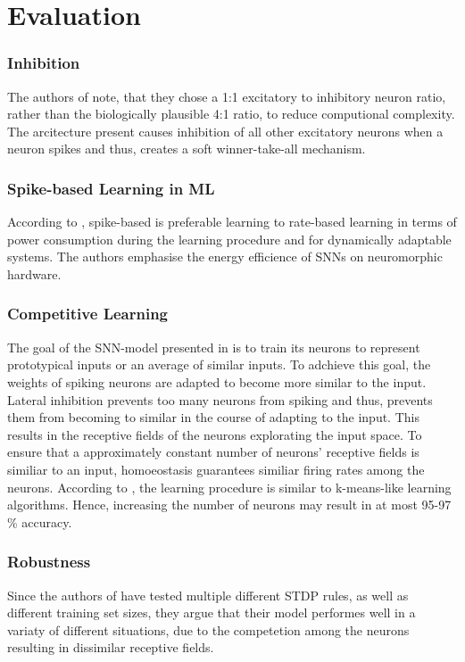\section{Evaluation}
\label{sec:evaluation}

\subsubsection{Inhibition}
The authors of \cite{SNN} note, that they chose a 1:1 excitatory to inhibitory neuron ratio, rather than the biologically plausible 4:1 ratio, 
to reduce computional complexity.
The arcitecture present causes inhibition of all other excitatory neurons when a neuron spikes and thus, 
creates a soft winner-take-all mechanism.


\subsubsection{Spike-based Learning in ML}
According to \cite{SNN}, spike-based is preferable learning to rate-based learning in terms of power consumption during the learning procedure and for 
dynamically adaptable systems.
The authors emphasise the energy efficience of \acp{SNN} on neuromorphic hardware.


\subsubsection{Competitive Learning}
The goal of the \ac{SNN}-model presented in \cite{SNN} is to train its neurons to represent prototypical inputs or an average of similar inputs.
To adchieve this goal, the weights of spiking neurons are adapted to become more similar to the input.
Lateral inhibition prevents too many neurons from spiking and thus, prevents them from becoming to similar in the course of adapting to the input.
This results in the receptive fields of the neurons explorating the input space.
To ensure that a approximately constant number of neurons' receptive fields is similiar to an input, 
homoeostasis guarantees similiar firing rates among the neurons.
According to \cite{SNN}, the learning procedure is similar to k-means-like learning algorithms.
Hence, increasing the number of neurons may result in at most 95-97 \% accuracy.

\subsubsection{Robustness}
Since the authors of \cite{SNN} have tested multiple different \ac{STDP} rules, as well as different training set sizes, 
they argue that their model performes well in a variaty of different situations, 
due to the competetion among the neurons resulting in dissimilar receptive fields.
